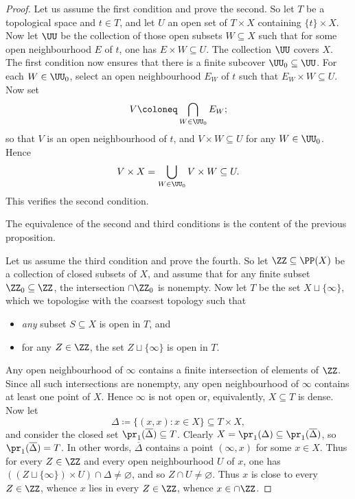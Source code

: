 \begin{proof}
	Let us assume the first condition and prove the second.
	So let $T$ be a topological space and $t\in T$, and
	let $U$ an open set of $T\times X$ containing $\{t\}\times X$.
	Now let $\UU$ be the collection of those open subsets $W\subseteq X$ such that for some open neighbourhood $E$ of $t$, one has $E\times W\subseteq U$.
	The collection $\UU$ covers%
	$X$.
	The first condition now ensures that there is a finite subcover $\UU_0\subseteq\UU$.
	For each $W\in\UU_0$, select an open neighbourhood $E_W$ of $t$ such that $E_W\times W\subseteq U$.
	Now set
	\[
		V\coloneq\bigcap_{W\in\UU_0}E_W;
	\]
	so that $V$ is an open neighbourhood of $t$, and $V\times W\subseteq U$ for any $W\in\UU_0$. Hence
	\[
		V\times X=\bigcup_{W\in\UU_0}V\times W\subseteq U.
	\]
	This verifies the second condition.

	The equivalence of the second and third conditions is the content of the previous proposition.

	Let us assume the third condition and prove the fourth.
	So let $\ZZ\subseteq\PP(X)$ be a collection of closed subsets of $X$, and
	assume that for any finite subset $\ZZ_0\subseteq\ZZ$, the intersection $\cap\ZZ_0$ is nonempty.
	Now let $T$ be the set $X\sqcup\{\infty\}$, which we topologise with the coarsest topology such that%
	\begin{itemize}
		\item \emph{any} subset $S\subseteq X$ is open in $T$, and
		\item for any $Z\in\ZZ$, the set $Z\sqcup\{\infty\}$ is open in $T$.
	\end{itemize}
	Any open neighbourhood of $\infty$ contains a finite intersection of elements of $\ZZ$.
	Since all such intersections are nonempty, any open neighbourhood of $\infty$ contains at least one point of $X$.
	Hence $\infty$ is not open or, equivalently, $X\subseteq T$ is dense.
	Now let
	\[
		\Delta \coloneq \{(x,x) : x\in X\} \subseteq T\times X\comma
	\]
	and consider the closed set $\pr_1(\overline{\Delta})\subseteq T$.
	Clearly $X=\pr_1(\Delta)\subseteq\pr_1(\overline{\Delta})$, so $\pr_1(\overline{\Delta})=T$.
	In other words, $\overline{\Delta}$ contains a point $(\infty, x)$ for some $x\in X$.
	Thus for every $Z\in\ZZ$ and every open neighbourhood $U$ of $x$, one has $((Z\sqcup\{\infty\})\times U)\cap\Delta\neq\varnothing$, and so%
	$Z\cap U\neq\varnothing$.
	Thus $x$ is close to every $Z\in\ZZ$, whence $x$ lies in every $Z\in\ZZ$, whence $x\in\cap\ZZ$.


\end{proof}
